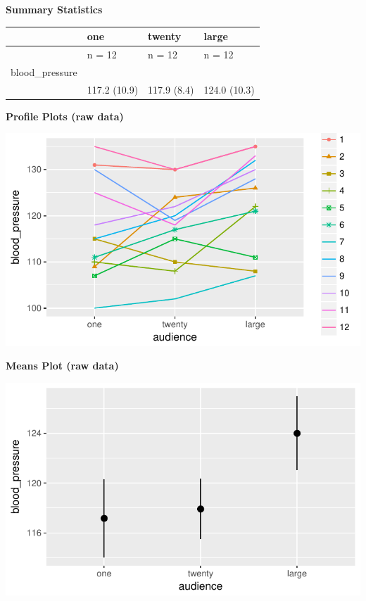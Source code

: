 \documentclass[]{article}
\begin{document}
\clearpage

\textbf{Summary Statistics}

\begin{longtable}[]{@{}llll@{}}
\toprule
& one & twenty & large\tabularnewline
\midrule
\endhead
& n = 12 & n = 12 & n = 12\tabularnewline
blood\_pressure & & &\tabularnewline
& 117.2 (10.9) & 117.9 (8.4) & 124.0 (10.3)\tabularnewline
\bottomrule
\end{longtable}

\textbf{Profile Plots (raw data)}

\begin{center}\includegraphics{Unit_5_assignment_SKELETON_R__spr18__files/figure-latex/unnamed-chunk-4-1} \end{center}

\textbf{Means Plot (raw data)}

\begin{center}\includegraphics{Unit_5_assignment_SKELETON_R__spr18__files/figure-latex/unnamed-chunk-5-1} \end{center}
\end{document}
